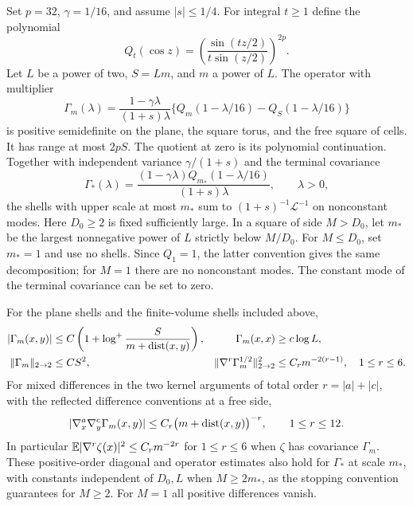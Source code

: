 \begin{lemma}\label{rg:kernels}
Set $p=32$, $\gamma=1/16$, and assume $|s|\le1/4$.  For integral $t\ge1$ define the polynomial
\[
 Q_t(\cos z)=\left(\frac{\sin(tz/2)}{t\sin(z/2)}\right)^{2p}.
\]
Let $L$ be a power of two, $S=Lm$, and $m$ a power of $L$.  The operator with multiplier
\begin{equation}\label{rg:shell}
 \Gamma_m(\lambda)=\frac{1-\gamma\lambda}{(1+s)\lambda}
 \{Q_m(1-\lambda/16)-Q_S(1-\lambda/16)\}
\end{equation}
is positive semidefinite on the plane, the square torus, and the free square of cells.  It has range at most $2pS$.  The quotient at zero is its polynomial continuation.  Together with independent variance $\gamma/(1+s)$ and the terminal covariance
\begin{equation}\label{rg:terminal-kernel}
 \Gamma_*(\lambda)=\frac{(1-\gamma\lambda)Q_{m_*}(1-\lambda/16)}{(1+s)\lambda},
 \qquad \lambda>0,
\end{equation}
the shells with upper scale at most $m_*$ sum to $(1+s)^{-1}\mathcal L^{-1}$ on nonconstant modes.  Here $D_0\ge2$ is fixed sufficiently large.  In a square of side $M>D_0$, let $m_*$ be the largest nonnegative power of $L$ strictly below $M/D_0$.  For $M\le D_0$, set $m_*=1$ and use no shells.  Since $Q_1=1$, the latter convention gives the same decomposition; for $M=1$ there are no nonconstant modes.  The constant mode of the terminal covariance can be set to zero.

For the plane shells and the finite-volume shells included above,
\begin{align}
 |\Gamma_m(x,y)|&\le C\left(1+\log^+\frac{S}{m+\operatorname{dist}(x,y)}\right),
 &\Gamma_m(x,x)&\ge c\log L,\label{rg:kernel-pointwise}\\
 \|\Gamma_m\|_{2\to2}&\le CS^2,
 &\|\nabla^r\Gamma_m^{1/2}\|_{2\to2}^2&\le C_r m^{-2(r-1)},\quad1\le r\le6.\label{rg:kernel-operator}
\end{align}
For mixed differences in the two kernel arguments of total order
$r=|a|+|c|$, with the reflected difference conventions at a free side,
\[
 |\nabla_x^a\nabla_y^c\Gamma_m(x,y)|
 \le C_r\bigl(m+\operatorname{dist}(x,y)\bigr)^{-r},
 \qquad 1\le r\le12.
\]
In particular $\mathbb E|\nabla^r\zeta(x)|^2\le C_r m^{-2r}$ for $1\le r\le6$ when $\zeta$ has covariance $\Gamma_m$.  These positive-order diagonal and operator estimates also hold for $\Gamma_*$ at scale $m_*$, with constants independent of $D_0,L$ when $M\ge2m_*$, as the stopping convention guarantees for $M\ge2$.  For $M=1$ all positive differences vanish.
\end{lemma}

